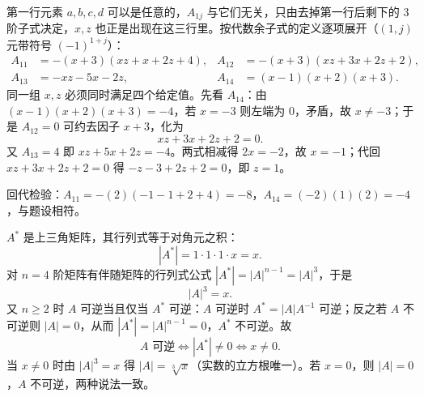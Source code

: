 \begin{solution}
第一行元素 $a,b,c,d$ 可以是任意的，$A_{1j}$ 与它们无关，只由去掉第一行后剩下的 $3$ 阶子式决定，$x,z$ 也正是出现在这三行里。按代数余子式的定义逐项展开（$(1,j)$ 元带符号 $(-1)^{1+j}$）：
\begin{align*}
A_{11}&=-(x+3)(xz+x+2z+4), & A_{12}&=-(x+3)(xz+3x+2z+2),\\
A_{13}&=-xz-5x-2z, & A_{14}&=(x-1)(x+2)(x+3).
\end{align*}
同一组 $x,z$ 必须同时满足四个给定值。先看 $A_{14}$：由 $(x-1)(x+2)(x+3)=-4$，若 $x=-3$ 则左端为 $0$，矛盾，故 $x\ne-3$；于是 $A_{12}=0$ 可约去因子 $x+3$，化为
\[
xz+3x+2z+2=0 .
\]
又 $A_{13}=4$ 即 $xz+5x+2z=-4$。两式相减得 $2x=-2$，故 $x=-1$；代回 $xz+3x+2z+2=0$ 得 $-z-3+2z+2=0$，即 $z=1$。

回代检验：$A_{11}=-(2)(-1-1+2+4)=-8$，$A_{14}=(-2)(1)(2)=-4$，与题设相符。
\end{solution}

\begin{solution}
$A^{*}$ 是上三角矩阵，其行列式等于对角元之积：
\[
|A^{*}|=1\cdot1\cdot1\cdot x=x .
\]
对 $n=4$ 阶矩阵有伴随矩阵的行列式公式 $|A^{*}|=|A|^{n-1}=|A|^{3}$，于是
\[
|A|^{3}=x .
\]
又 $n\ge2$ 时 $A$ 可逆当且仅当 $A^{*}$ 可逆：$A$ 可逆时 $A^{*}=|A|A^{-1}$ 可逆；反之若 $A$ 不可逆则 $|A|=0$，从而 $|A^{*}|=|A|^{n-1}=0$，$A^{*}$ 不可逆。故
\[
A\text{ 可逆}\iff |A^{*}|\ne0\iff x\ne0 .
\]
当 $x\ne0$ 时由 $|A|^{3}=x$ 得 $|A|=\sqrt[3]{x}$（实数的立方根唯一）。若 $x=0$，则 $|A|=0$，$A$ 不可逆，两种说法一致。
\end{solution}

